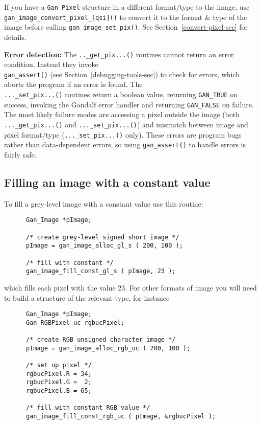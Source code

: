 If you have a {\tt Gan\_Pixel} structure in a different format/type to the
image, use {\tt gan\_image\_convert\_pixel\_[qsi]()} to convert
it to the format \& type of the image before calling
{\tt gan\_image\_set\_pix()}. See Section~\ref{convert-pixel-sec} for
details.

{\bf Error detection:} The {\tt ..\_get\_pix...()} routines cannot return
an error condition. Instead they invoke\\ {\tt gan\_assert()}
(see Section~\ref{debugging-tools-sec}) to check for errors, which aborts the
program if an error is found. The\\ {\tt ...\_set\_pix...()} routines return
a boolean value, returning {\tt GAN\_TRUE} on success, invoking the
Gandalf error handler and returning {\tt GAN\_FALSE} on failure.
The most likely failure modes are accessing a pixel outside the image
(both {\tt ...\_get\_pix...()} and {\tt ...\_set\_pix...()}) and
mismatch between image and pixel format/type ({\tt ...\_set\_pix...()} only).
These errors are program bugs rather than data-dependent errors, so
using {\tt gan\_assert()} to handle errors is fairly safe.

\subsection{Filling an image with a constant value}
To fill a grey-level image with a constant value use this routine:
\begin{verbatim}
      Gan_Image *pImage;

      /* create grey-level signed short image */
      pImage = gan_image_alloc_gl_s ( 200, 100 );

      /* fill with constant */
      gan_image_fill_const_gl_s ( pImage, 23 );
\end{verbatim}
which fills each pixel with the value 23. For other formats of image
you will need to build a structure of the relevant type, for instance
\begin{verbatim}
      Gan_Image *pImage;
      Gan_RGBPixel_uc rgbucPixel;

      /* create RGB unsigned character image */
      pImage = gan_image_alloc_rgb_uc ( 200, 100 );

      /* set up pixel */
      rgbucPixel.R = 34;
      rgbucPixel.G =  2;
      rgbucPixel.B = 65;

      /* fill with constant RGB value */
      gan_image_fill_const_rgb_uc ( pImage, &rgbucPixel );
\end{verbatim}

